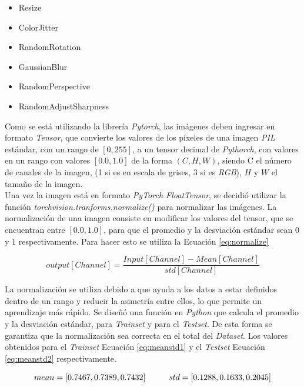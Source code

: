 \begin{itemize}
	\item Resize
	\item ColorJitter
	\item RandomRotation
	\item GaussianBlur
	\item RandomPerspective
	\item RandomAdjustSharpness
\end{itemize}

Como se está utilizando la librería \textit{Pytorch}, las imágenes deben ingresar en formato \textit{Tensor}, que convierte los valores de los píxeles de una imagen \textit{PIL} estándar, con un rango de $[0, 255]$,  a un tensor decimal de \textit{Pythorch}, con valores en un rango con valores $[0.0, 1.0]$ de la forma  $(C, H, W)$, siendo C el número de canales de la imagen, (1 si es en escala de grises, 3 si es \textit{RGB}), $H$ y $W$ el tamaño de la imagen. \\

Una vez la imagen está en formato \textit{PyTorch FloatTensor}, se decidió utilizar la función \textit{torchvision.tranforms.normalize()} para normalizar las imágenes. La normalización de una imagen consiste en modificar los valores del tensor, que se encuentran entre $[0.0, 1.0]$, para que el promedio y la desviación estándar sean $0$ y $1$ respectivamente. Para hacer esto se utiliza la Ecuación \ref{eq:normalize} \cite{Pytorch}

\begin{equation}
	{output[Channel]=\frac{Input[Channel]-Mean[Channel]}{std[Channel]}}
	\label{eq:normalize}
\end{equation}

La normalización se utiliza debido a que ayuda a los datos a estar definidos dentro de un rango y reducir la asimetría entre ellos, lo que permite un aprendizaje más rápido. Se diseñó una función en \textit{Python} que calcula el promedio y la desviación estándar, para \textit{Trainset} y para el \textit{Testset}. De esta forma se garantiza que la normalización sea correcta en el total del \textit{Dataset}. Los valores obtenidos para el \textit{Trainset} Ecuación \ref{eq:meanstd1} y el \textit{Testset} Ecuación \ref{eq:meanstd2} respectivamente.

\begin{equation}				{mean = [0.7467, 0.7389, 0.7432] \hspace*{1cm}  std  = [0.1288, 0.1633, 0.2045]}
	\label{eq:meanstd1}
\end{equation}


